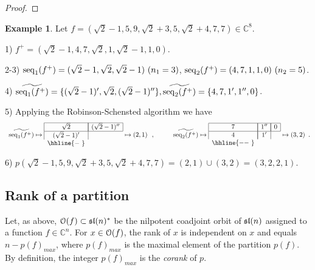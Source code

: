 \documentclass[10pt]{amsart}\oddsidemargin -1mm \evensidemargin -1mm \topmargin -15mm\headheight5mm \headsep 3.5mm \textheight 245mm\textwidth 170mm %
\theoremstyle{definition}\newtheorem{theorem}{Theorem}[section]\newtheorem{lemma}[theorem]{Lemma}\newtheorem{remark}[theorem]{Remark}\newtheorem{proposition}[theorem]{Proposition}\newtheorem{corollary}[theorem]{Corollary}\newtheorem{definition}[theorem]{Definition}\newtheorem{Ex}[theorem]{Example}
\begin{document}
\begin{proof}

\end{proof}

\begin{Ex} Let $f=(\sqrt 2-1, 5, 9, \sqrt 2+3, 5,\sqrt 2+4, 7, 7)\in\mathbb C^8$.

1) $f^+=(\sqrt 2-1, 4, 7, \sqrt2, 1, \sqrt 2-1, 1, 0)$.

2-3) $\operatorname{\mathrm{seq}}_1(f^+)=(\sqrt 2-1, \sqrt2, \sqrt 2-1) ~(n_1=3)$, $\operatorname{\mathrm{seq}}_2(f^+)=(4,
7, 1, 1, 0)~(n_2=5)$.

4) $\widetilde{\operatorname{\mathrm{seq}}_1(f^+)}=\{(\sqrt 2-1)', \sqrt 2, (\sqrt 2-1)''\}, \widetilde{\operatorname{\mathrm{seq}}_2(f^+)}=\{4, 7, 1', 1'', 0\}$.

5) Applying the Robinson-Schensted algorithm we have$$\begin{array}{ll}\widetilde{\seq_1(f^+)}\mapsto
\begin{array}{cc}
\hline\multicolumn{1}{|c|}{\sqrt 2}&\multicolumn{1}{|c|}{(\sqrt 2-1)''}\\
\hline \multicolumn{1}{|c|}{(\sqrt 2-1)'}&\\
\hhline{-~}
\end{array}\mapsto (2, 1)~~,
&
\hspace{20pt}\widetilde{\seq_2(f^+)}\mapsto
\begin{array}{ccc}\hline
\multicolumn{1}{|c|}{7}&\multicolumn{1}{|c|}{1''}&\multicolumn{1}{|c|}{0}\\
\hline\multicolumn{1}{|c|}{4}&\multicolumn{1}{|c|}{1'}&\\
\hhline{--~}\end{array}\mapsto (3, 2)\end{array}.
$$

6) $p(\sqrt 2-1, 5, 9, \sqrt 2+3, 5,\sqrt 2+4, 7, 7)=(2, 1)\cup(3, 2)=(3, 2, 2, 1).$
\end{Ex}

\subsection{Rank of a partition}\label{SSSrrsa} Let, as above, $\EuScript
O(f)\subset\frak{sl}(n)^*$ be the nilpotent coadjoint orbit of $\frak{sl}(n)$ assigned to a function $f\in\mathbb C^n$. For $x\in\EuScript O(f)$, the rank of $x$ is independent on $x$ and equals $n-p(f)_{max}$, where $p(f)_{max}$ is the maximal element of the partition $p(f)$. By definition, the integer $p(f)_{max}$ is the {\it corank} of $p$.
\end{document}
